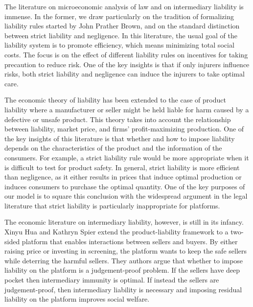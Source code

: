 \label{sec:background}

The literature on microeconomic analysis of law and on intermediary liability is immense. In the former, we draw particularly on the tradition of formalizing liability rules started by John Prather Brown, and on the standard distinction between strict liability and negligence. In this literature, the usual goal of the liability system is to promote efficiency, which means minimizing total social costs. The focus is on the effect of different liability rules on incentives for taking precaution to reduce risk. One of the key insights is that if only injurers influence risks, both strict liability and negligence can induce the injurers to take optimal care.  

The economic theory of liability has been extended to the case of product liability where a manufacturer or seller might be held liable for harm caused by a defective or unsafe product.  This theory takes into account the relationship between liability, market price, and firms' profit-maximizing production. One of the key insights of this literature is that whether and how to impose liability depends on the characteristics of the product and the information of the consumers.   For example, a strict liability rule would be more appropriate when it is difficult to test for product safety. In general, strict liability is more efficient than negligence, as it either results in prices that induce optimal production or induces consumers to purchase the optimal quantity. One of the key purposes of our model is to square this conclusion with the widespread argument in the legal literature that strict liability is particularly inappropriate for platforms.

The economic literature on intermediary liability, however, is still in its infancy.  Xinyu Hua and Kathryn Spier extend the product-liability framework to a two-sided platform that enables interactions between sellers and buyers. By either raising price or investing in screening, the platform wants to keep the safe sellers while deterring the harmful sellers. They authors argue that whether to impose liability on the platform is a judgement-proof problem. If the sellers have deep pocket then intermediary immunity is optimal. If instead the sellers are judgement-proof, then intermediary liability is necessary and imposing residual liability on the platform improves social welfare. 

